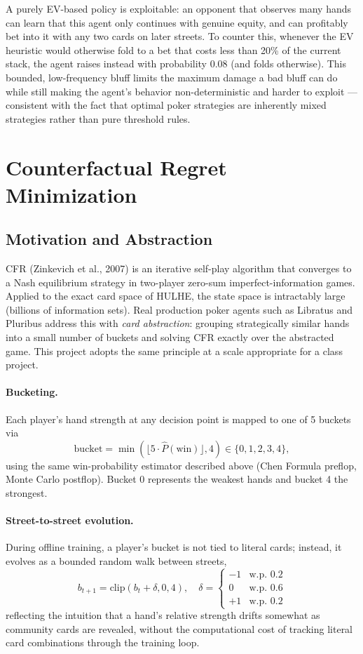 \documentclass[11pt]{article}
\begin{document}
A purely EV-based policy is exploitable: an opponent that observes many
hands can learn that this agent only continues with genuine equity, and can
profitably bet into it with any two cards on later streets. To counter this,
whenever the EV heuristic would otherwise fold to a bet that costs less than
20\% of the current stack, the agent raises instead with probability $0.08$
(and folds otherwise). This bounded, low-frequency bluff limits the maximum
damage a bad bluff can do while still making the agent's behavior
non-deterministic and harder to exploit --- consistent with the fact that
optimal poker strategies are inherently mixed strategies rather than pure
threshold rules.

\section{Counterfactual Regret Minimization}

\subsection{Motivation and Abstraction}

CFR (Zinkevich et al., 2007) is an iterative self-play algorithm that
converges to a Nash equilibrium strategy in two-player zero-sum
imperfect-information games. Applied to the exact card space of HULHE, the
state space is intractably large (billions of information sets). Real
production poker agents such as Libratus and Pluribus address this with
\emph{card abstraction}: grouping strategically similar hands into a small
number of buckets and solving CFR exactly over the abstracted game. This
project adopts the same principle at a scale appropriate for a class
project.

\paragraph{Bucketing.} Each player's hand strength at any decision point is
mapped to one of 5 buckets via
\[
    \text{bucket} = \min(\lfloor 5 \cdot \hat{P}(\text{win}) \rfloor, 4) \in \{0, 1, 2, 3, 4\},
\]
using the same win-probability estimator described above (Chen Formula
preflop, Monte Carlo postflop). Bucket 0 represents the weakest hands and
bucket 4 the strongest.

\paragraph{Street-to-street evolution.} During offline training, a player's
bucket is not tied to literal cards; instead, it evolves as a bounded random
walk between streets,
\[
    b_{t+1} = \text{clip}(b_t + \delta, 0, 4), \quad
    \delta = \begin{cases} -1 & \text{w.p. } 0.2 \\ 0 & \text{w.p. } 0.6 \\ +1 & \text{w.p. } 0.2 \end{cases}
\]
reflecting the intuition that a hand's relative strength drifts somewhat as
community cards are revealed, without the computational cost of tracking
literal card combinations through the training loop.
\end{document}
